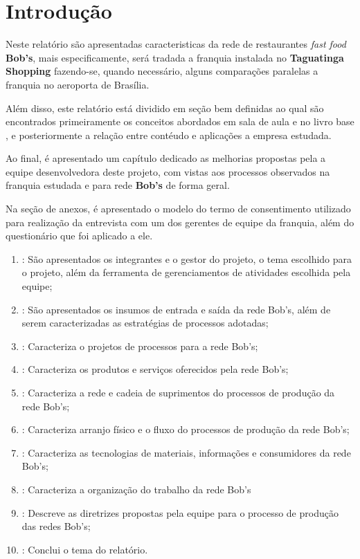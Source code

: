 \chapter[Introdução]{Introdução}
\label{chap:introducao}
	
	Neste relatório são apresentadas caracteristicas da rede de restaurantes \emph{fast food} \textbf{Bob's}, mais especificamente, será tradada a franquia instalada no \textbf{Taguatinga Shopping} fazendo-se, quando necessário, alguns comparações paralelas a franquia no aeroporta de Brasília.

	Além disso, este relatório está dividido em seção bem definidas ao qual são encontrados primeiramente os conceitos abordados em sala de aula e no livro base \cite{slack}, e posteriormente a relação entre contéudo e aplicações a empresa estudada.

	Ao final, é apresentado um capítulo dedicado as melhorias propostas pela a equipe desenvolvedora deste projeto, com vistas aos processos observados na franquia estudada e para rede \textbf{Bob's} de forma geral.

	Na seção de anexos, é apresentado o modelo do termo de consentimento utilizado para realização da entrevista com um dos gerentes de equipe da franquia, além do questionário que foi aplicado a ele.

	\begin{enumerate}
		\item{\textbf{}: São apresentados os integrantes e o gestor do projeto, o tema escolhido para o projeto, além da ferramenta de gerenciamentos de atividades escolhida pela equipe;}
		\item{\textbf{}: São apresentados os insumos de entrada e saída da rede Bob's, além de serem caracterizadas as estratégias de processos adotadas;}
		\item{\textbf{}: Caracteriza o projetos de processos para a rede Bob's;}
		\item{\textbf{}: Caracteriza os produtos e serviços oferecidos pela rede Bob's;}
		\item{\textbf{}: Caracteriza a rede e cadeia de suprimentos do processos de produção da rede Bob's;}
		\item{\textbf{}: Caracteriza arranjo físico e o fluxo do processos de produção da rede Bob's;}
		\item{\textbf{}: Caracteriza as tecnologias de materiais, informações e consumidores da rede Bob's;}
		\item{\textbf{}: Caracteriza a organização do trabalho da rede Bob's}
		\item{\textbf{}: Descreve as diretrizes propostas pela equipe para o processo de produção das redes Bob's;}
		\item{\textbf{}: Conclui o tema do relatório.}
	\end{enumerate}
